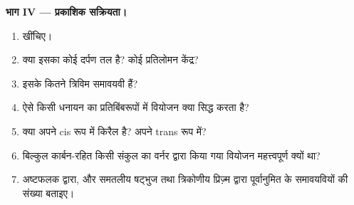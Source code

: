 \begin{problem}
\medskip
\noindent\textbf{भाग IV --- प्रकाशिक सक्रियता।}
\begin{enumerate}[resume]
  \item {} खींचिए।
  \item क्या इसका कोई दर्पण तल है? कोई प्रतिलोमन केंद्र?
  \item इसके कितने त्रिविम समावयवी हैं?
  \item ऐसे किसी धनायन का प्रतिबिंबरूपों में वियोजन क्या सिद्ध करता है?
  \item क्या \ce{[CoCl2(en)2]+} अपने cis रूप में किरैल है? अपने trans रूप में?
  \item बिल्कुल कार्बन-रहित किसी संकुल का वर्नर द्वारा किया गया वियोजन महत्त्वपूर्ण क्यों था?
  \item अष्टफलक द्वारा, और समतलीय षट्भुज तथा त्रिकोणीय प्रिज़्म द्वारा पूर्वानुमित
        \ce{[CoCl2(NH3)4]+} के समावयवियों की संख्या बताइए।
\end{enumerate}
\end{problem}
